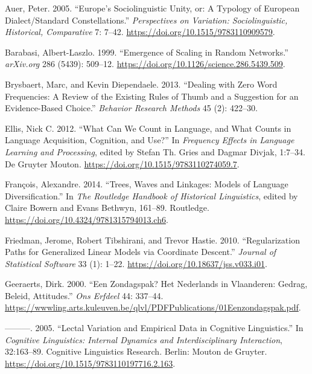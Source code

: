 \documentclass[
  letterpaper,
  DIV=11,
  numbers=noendperiod,
  oneside]{scrartcl}
\newlength{\cslhangindent}
\newenvironment{CSLReferences}[2] %
 {\begin{list}{}{%
  \setlength{\itemindent}{0pt}
  \setlength{\leftmargin}{0pt}
  \setlength{\parsep}{0pt}
  \ifodd #1
   \setlength{\leftmargin}{\cslhangindent}
   \setlength{\itemindent}{-1\cslhangindent}
  \fi
  \setlength{\itemsep}{#2\baselineskip}}}
 {\end{list}}
\begin{document}
\label{refs}
\begin{CSLReferences}{1}{0}
Auer, Peter. 2005. {``Europe's Sociolinguistic Unity, or: A Typology of
European Dialect/Standard Constellations.''} \emph{Perspectives on
Variation: Sociolinguistic, Historical, Comparative} 7: 7--42.
\url{https://doi.org/10.1515/9783110909579}.

Barabasi, Albert-Laszlo. 1999. {``Emergence of Scaling in Random
Networks.''} \emph{arXiv.org} 286 (5439): 509--12.
\url{https://doi.org/10.1126/science.286.5439.509}.

Brysbaert, Marc, and Kevin Diependaele. 2013. {``Dealing with Zero Word
Frequencies: {A} Review of the Existing Rules of Thumb and a Suggestion
for an Evidence-Based Choice.''} \emph{Behavior Research Methods} 45
(2): 422--30.

Ellis, Nick C. 2012. {``What Can We Count in Language, and What Counts
in Language Acquisition, Cognition, and Use?''} In \emph{Frequency
{Effects} in {Language} {Learning} and {Processing}}, edited by Stefan
Th. Gries and Dagmar Divjak, 1:7--34. De Gruyter Mouton.
\url{https://doi.org/10.1515/9783110274059.7}.

François, Alexandre. 2014. {``Trees, {Waves} and {Linkages}: {Models} of
{Language} {Diversification}.''} In \emph{The {Routledge} {Handbook} of
{Historical} {Linguistics}}, edited by Claire Bowern and Evans Bethwyn,
161--89. Routledge. \url{https://doi.org/10.4324/9781315794013.ch6}.

Friedman, Jerome, Robert Tibshirani, and Trevor Hastie. 2010.
{``Regularization {Paths} for {Generalized} {Linear} {Models} via
{Coordinate} {Descent}.''} \emph{Journal of Statistical Software} 33
(1): 1--22. \url{https://doi.org/10.18637/jss.v033.i01}.

Geeraerts, Dirk. 2000. {``Een Zondagspak? {Het} {Nederlands} in
{Vlaanderen}: Gedrag, Beleid, Attitudes.''} \emph{Ons Erfdeel} 44:
337--44.
\url{https://wwwling.arts.kuleuven.be/qlvl/PDFPublications/01Eenzondagspak.pdf}.

---------. 2005. {``Lectal Variation and Empirical Data in Cognitive
Linguistics.''} In \emph{Cognitive Linguistics: Internal Dynamics and
Interdisciplinary Interaction}, 32:163--89. Cognitive Linguistics
Research. Berlin: Mouton de Gruyter.
\url{https://doi.org/10.1515/9783110197716.2.163}.


\end{CSLReferences}
\end{document}
